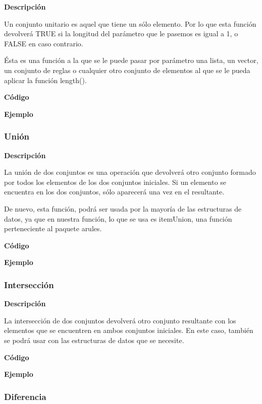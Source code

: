     \textbf{Descripci\'on}
    
    Un conjunto unitario es aquel que tiene un s\'olo elemento. Por lo que esta funci\'on 
    devolver\'a TRUE si la longitud del par\'ametro que le pasemos es igual a 1, o FALSE en caso 
    contrario.

    \'Esta es una función a la que se le puede pasar por par\'ametro una lista, un vector, 
    un conjunto de reglas o cualquier otro conjunto de elementos al que se le pueda aplicar la funci\'on 
    length().


    \textbf{C\'odigo}

    
    \textbf{Ejemplo}



\subsubsection{Uni\'on}

    \textbf{Descripci\'on}

    La uni\'on de dos conjuntos es una operaci\'on que devolver\'a otro conjunto formado por 
    todos los elementos de los dos conjuntos iniciales. Si un elemento se encuentra en los dos 
    conjuntos, s\'olo aparecer\'a una vez en el resultante.
    
    De nuevo, esta funci\'on, podr\'a ser usada por la mayor\'ia de las estructuras de datos, ya que en 
    nuestra funci\'on, lo que se usa es itemUnion, una funci\'on perteneciente al paquete arules.

    \textbf{C\'odigo}

    
    \textbf{Ejemplo}




\subsubsection{Intersecci\'on}

    \textbf{Descripci\'on}
    
    La intersecci\'on de dos conjuntos devolver\'a otro conjunto resultante con los elementos 
    que se encuentren en ambos conjuntos iniciales. En este caso, tambi\'en se podr\'a usar con las 
    estructuras de datos que se necesite.

    \textbf{C\'odigo}

    
    \textbf{Ejemplo}




\subsubsection{Diferencia}

